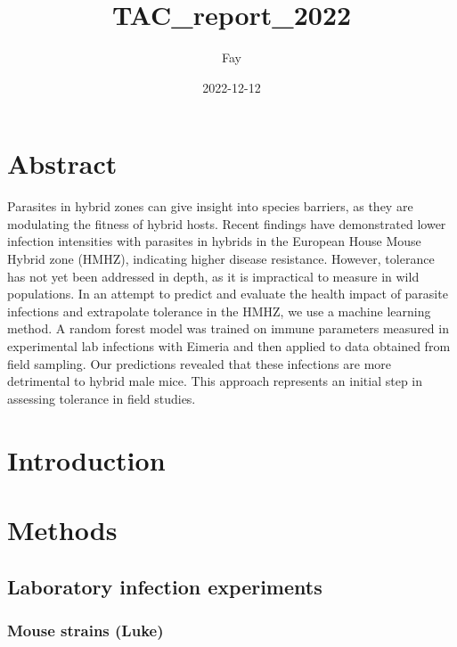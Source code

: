 \documentclass[
]{article}
\title{TAC\_report\_2022}
\author{Fay}
\date{2022-12-12}
\begin{document}
\maketitle

\hypertarget{abstract}{%
\section{Abstract}\label{abstract}}

Parasites in hybrid zones can give insight into species barriers, as
they are modulating the fitness of hybrid hosts. Recent findings have
demonstrated lower infection intensities with parasites in hybrids in
the European House Mouse Hybrid zone (HMHZ), indicating higher disease
resistance. However, tolerance has not yet been addressed in depth, as
it is impractical to measure in wild populations. In an attempt to
predict and evaluate the health impact of parasite infections and
extrapolate tolerance in the HMHZ, we use a machine learning method. A
random forest model was trained on immune parameters measured in
experimental lab infections with Eimeria and then applied to data
obtained from field sampling. Our predictions revealed that these
infections are more detrimental to hybrid male mice. This approach
represents an initial step in assessing tolerance in field studies.

\hypertarget{introduction}{%
\section{Introduction}\label{introduction}}

\hypertarget{methods}{%
\section{Methods}\label{methods}}

\hypertarget{laboratory-infection-experiments}{%
\subsection{Laboratory infection
experiments}\label{laboratory-infection-experiments}}

\hypertarget{mouse-strains-luke}{%
\subsubsection{Mouse strains (Luke)}\label{mouse-strains-luke}}
\end{document}
